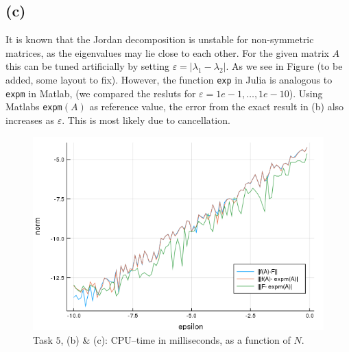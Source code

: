 \subsection*{(c)}
It is known that the Jordan decomposition is unstable for non-symmetric matrices, as the eigenvalues may lie close to each other. For the given matrix $A$ this can be tuned artificially by setting $\varepsilon=|\lambda_{1}-\lambda_{2}|$. As we see in Figure (to be added, some layout to fix). However, the function \texttt{exp} in Julia is analogous to \texttt{expm} in Matlab, (we compared the resluts for $\varepsilon = 1e-1,\ldots,1e-10$). Using Matlabs \texttt{expm}$(A)$ as reference value, the error from the exact result in (b) also increases as $\varepsilon$. This is most likely due to cancellation.

\begin{figure}
\centering
\includegraphics[scale=0.6]{Task6}
\caption{Task $5$, (b) \& (c):  CPU--time in milliseconds, as a function of $N$.}
\label{fig:task}
\end{figure}
